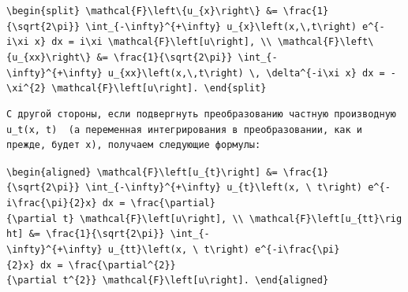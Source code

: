 \documentclass[
  ukrainian,
]{article}
\begin{document}
\texttt{\textbackslash{}begin\{split\}\ \textbackslash{}mathcal\{F\}\textbackslash{}left\textbackslash{}\{u\_\{x\}\textbackslash{}right\textbackslash{}\}\ \&=\ \textbackslash{}frac\{1\}\{\textbackslash{}sqrt\{2\textbackslash{}pi\}\}\ \textbackslash{}int\_\{-\textbackslash{}infty\}\^{}\{+\textbackslash{}infty\}\ u\_\{x\}\textbackslash{}left(x,\textbackslash{},t\textbackslash{}right)\ e\^{}\{-i\textbackslash{}xi\ x\}\ dx\ =\ i\textbackslash{}xi\ \textbackslash{}mathcal\{F\}\textbackslash{}left{[}u\textbackslash{}right{]},\ \textbackslash{}\textbackslash{}\ \textbackslash{}mathcal\{F\}\textbackslash{}left\textbackslash{}\{u\_\{xx\}\textbackslash{}right\textbackslash{}\}\ \&=\ \textbackslash{}frac\{1\}\{\textbackslash{}sqrt\{2\textbackslash{}pi\}\}\ \textbackslash{}int\_\{-\textbackslash{}infty\}\^{}\{+\textbackslash{}infty\}\ u\_\{xx\}\textbackslash{}left(x,\textbackslash{},t\textbackslash{}right)\ \textbackslash{},\ \textbackslash{}delta\^{}\{-i\textbackslash{}xi\ x\}\ dx\ =\ -\textbackslash{}xi\^{}\{2\}\ \textbackslash{}mathcal\{F\}\textbackslash{}left{[}u\textbackslash{}right{]}.\ \textbackslash{}end\{split\}}

\begin{verbatim}
С другой стороны, если подвергнуть преобразованию частную производную  u_t(x, t)  (а переменная интегрирования в преобразовании, как и прежде, будет x), получаем следующие формулы:
\end{verbatim}

\texttt{\textbackslash{}begin\{aligned\}\ \textbackslash{}mathcal\{F\}\textbackslash{}left{[}u\_\{t\}\textbackslash{}right{]}\ \&=\ \textbackslash{}frac\{1\}\{\textbackslash{}sqrt\{2\textbackslash{}pi\}\}\ \textbackslash{}int\_\{-\textbackslash{}infty\}\^{}\{+\textbackslash{}infty\}\ u\_\{t\}\textbackslash{}left(x,\ \textbackslash{}\ t\textbackslash{}right)\ e\^{}\{-i\textbackslash{}frac\{\textbackslash{}pi\}\{2\}x\}\ dx\ =\ \textbackslash{}frac\{\textbackslash{}partial\}\{\textbackslash{}partial\ t\}\ \textbackslash{}mathcal\{F\}\textbackslash{}left{[}u\textbackslash{}right{]},\ \textbackslash{}\textbackslash{}\ \textbackslash{}mathcal\{F\}\textbackslash{}left{[}u\_\{tt\}\textbackslash{}right{]}\ \&=\ \textbackslash{}frac\{1\}\{\textbackslash{}sqrt\{2\textbackslash{}pi\}\}\ \textbackslash{}int\_\{-\textbackslash{}infty\}\^{}\{+\textbackslash{}infty\}\ u\_\{tt\}\textbackslash{}left(x,\ \textbackslash{}\ t\textbackslash{}right)\ e\^{}\{-i\textbackslash{}frac\{\textbackslash{}pi\}\{2\}x\}\ dx\ =\ \textbackslash{}frac\{\textbackslash{}partial\^{}\{2\}\}\{\textbackslash{}partial\ t\^{}\{2\}\}\ \textbackslash{}mathcal\{F\}\textbackslash{}left{[}u\textbackslash{}right{]}.\ \textbackslash{}end\{aligned\}}
\end{document}
